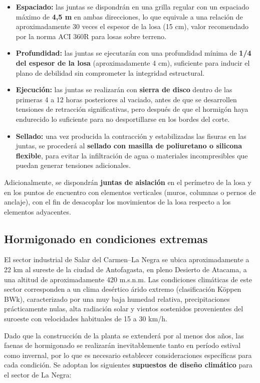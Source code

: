 \begin{itemize}
    \item \textbf{Espaciado:} las juntas se dispondrán en una grilla regular con un espaciado máximo de \textbf{4{,}5 m} en ambas direcciones, lo que equivale a una relación de aproximadamente 30 veces el espesor de la losa (15 cm), valor recomendado por la norma ACI 360R \cite{CITAR_ACI360} para losas sobre terreno.
    \item \textbf{Profundidad:} las juntas se ejecutarán con una profundidad mínima de \textbf{1/4 del espesor de la losa} (aproximadamente 4 cm), suficiente para inducir el plano de debilidad sin comprometer la integridad estructural.
    \item \textbf{Ejecución:} las juntas se realizarán con \textbf{sierra de disco} dentro de las primeras 4 a 12 horas posteriores al vaciado, antes de que se desarrollen tensiones de retracción significativas, pero después de que el hormigón haya endurecido lo suficiente para no desportillarse en los bordes del corte.
    \item \textbf{Sellado:} una vez producida la contracción y estabilizadas las fisuras en las juntas, se procederá al \textbf{sellado con masilla de poliuretano o silicona flexible}, para evitar la infiltración de agua o materiales incompresibles que puedan generar tensiones adicionales.
\end{itemize}

Adicionalmente, se dispondrán \textbf{juntas de aislación} en el perímetro de la losa y en los puntos de encuentro con elementos verticales (muros, columnas o pernos de anclaje), con el fin de desacoplar los movimientos de la losa respecto a los elementos adyacentes.

\subsection{Hormigonado en condiciones extremas}

El sector industrial de Salar del Carmen--La Negra se ubica aproximadamente a 22 km al sureste de la ciudad de Antofagasta, en pleno Desierto de Atacama, a una altitud de aproximadamente 420 m.s.n.m. Las condiciones climáticas de este sector corresponden a un clima desértico árido extremo (clasificación Köppen BWk), caracterizado por una muy baja humedad relativa, precipitaciones prácticamente nulas, alta radiación solar y vientos sostenidos provenientes del suroeste con velocidades habituales de 15 a 30 km/h.

Dado que la construcción de la planta se extenderá por al menos dos años, las faenas de hormigonado se realizarán inevitablemente tanto en período estival como invernal, por lo que es necesario establecer consideraciones específicas para cada condición. Se adoptan los siguientes \textbf{supuestos de diseño climático} para el sector de La Negra:

